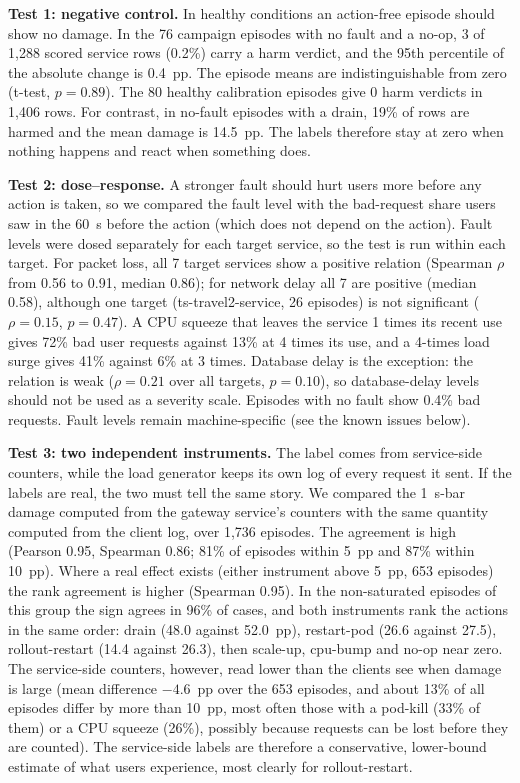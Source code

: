 \noindent\textbf{Test 1: negative control.} In healthy conditions an action-free episode should show no damage. In the 76 campaign episodes with no fault and a no-op, 3 of 1,288 scored service rows (0.2\%) carry a harm verdict, and the 95th percentile of the absolute change is 0.4~pp. The episode means are indistinguishable from zero (t-test, $p = 0.89$). The 80 healthy calibration episodes give 0 harm verdicts in 1,406 rows. For contrast, in no-fault episodes with a drain, 19\% of rows are harmed and the mean damage is 14.5~pp. The labels therefore stay at zero when nothing happens and react when something does.

\noindent\textbf{Test 2: dose--response.} A stronger fault should hurt users more before any action is taken, so we compared the fault level with the bad-request share users saw in the 60~s before the action (which does not depend on the action). Fault levels were dosed separately for each target service, so the test is run within each target. For packet loss, all 7 target services show a positive relation (Spearman $\rho$ from 0.56 to 0.91, median 0.86); for network delay all 7 are positive (median 0.58), although one target (ts-travel2-service, 26 episodes) is not significant ($\rho = 0.15$, $p = 0.47$). A CPU squeeze that leaves the service 1 times its recent use gives 72\% bad user requests against 13\% at 4 times its use, and a 4-times load surge gives 41\% against 6\% at 3 times. Database delay is the exception: the relation is weak ($\rho = 0.21$ over all targets, $p = 0.10$), so database-delay levels should not be used as a severity scale. Episodes with no fault show 0.4\% bad requests. Fault levels remain machine-specific (see the known issues below).

\noindent\textbf{Test 3: two independent instruments.} The label comes from service-side counters, while the load generator keeps its own log of every request it sent. If the labels are real, the two must tell the same story. We compared the 1~s-bar damage computed from the gateway service's counters with the same quantity computed from the client log, over 1{,}736 episodes. The agreement is high (Pearson 0.95, Spearman 0.86; 81\% of episodes within 5~pp and 87\% within 10~pp). Where a real effect exists (either instrument above 5~pp, 653 episodes) the rank agreement is higher (Spearman 0.95). In the non-saturated episodes of this group the sign agrees in 96\% of cases, and both instruments rank the actions in the same order: drain (48.0 against 52.0~pp), restart-pod (26.6 against 27.5), rollout-restart (14.4 against 26.3), then scale-up, cpu-bump and no-op near zero. The service-side counters, however, read lower than the clients see when damage is large (mean difference $-4.6$~pp over the 653 episodes, and about 13\% of all episodes differ by more than 10~pp, most often those with a pod-kill (33\% of them) or a CPU squeeze (26\%), possibly because requests can be lost before they are counted). The service-side labels are therefore a conservative, lower-bound estimate of what users experience, most clearly for rollout-restart.

